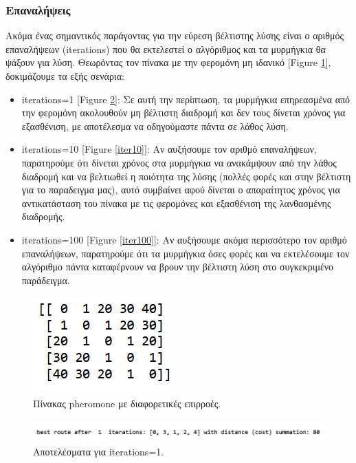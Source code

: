 \subsubsection{Επαναλήψεις}
Ακόμα ένας σημαντικός παράγοντας για την εύρεση βέλτιστης λύσης είναι ο αριθμός επαναλήψεων (iterations) που θα εκτελεστεί ο αλγόριθμος και τα μυρμήγκια θα ψάξουν για λύση. Θεωρόντας τον πίνακα με την φερομόνη μη ιδανικό [Figure \ref{pher2}], δοκιμάζουμε τα εξής σενάρια:
\begin{itemize}
    \item iterations=1 [Figure \ref{iter1}]:
    Σε αυτή την περίπτωση, τα μυρμήγκια επηρεασμένα από την φερομόνη ακολουθούν μη βέλτιστη διαδρομή και δεν τους δίνεται χρόνος για εξασθένιση, με αποτέλεσμα να οδηγούμαστε πάντα σε λάθος λύση.
    \item iterations=10 [Figure \ref{iter10}]:
    Αν αυξήσουμε τον αριθμό επαναλήψεων, παρατηρούμε ότι δίνεται χρόνος στα μυρμήγκια να ανακάμψουν από την λάθος διαδρομή και να βελτιωθεί η ποιότητα της λύσης (πολλές φορές και στην βέλτιστη για το παραδειγμα μας), αυτό συμβαίνει αφού δίνεται ο απαραίτητος χρόνος για αντικατάσταση του πίνακα με τις φερομόνες και εξασθένιση της λανθασμένης διαδρομής.
    \item iterations=100 [Figure \ref{iter100}]:
    Αν αυξήσουμε ακόμα περισσότερο τον αριθμό επαναλήψεων, παρατηρούμε ότι τα μυρμήγκια όσες φορές και να εκτελέσουμε τον αλγόριθμο πάντα καταφέρνουν να βρουν την βέλτιστη λύση στο συγκεκριμένο παράδειγμα.
\end{itemize}
\begin{figure}
    \centering
    \includegraphics[scale=1]{2947_thesis/pictures/pheromone2.png} 
    \caption{Πίνακας pheromone με διαφορετικές επιρροές.}
    \label{pher2}
\end{figure}
\begin{figure}
    \centering
    \includegraphics[scale=0.55]{2947_thesis/pictures/ex4.png} 
    \caption{Αποτελέσματα για iterations=1.}
    \label{iter1}
\end{figure}
